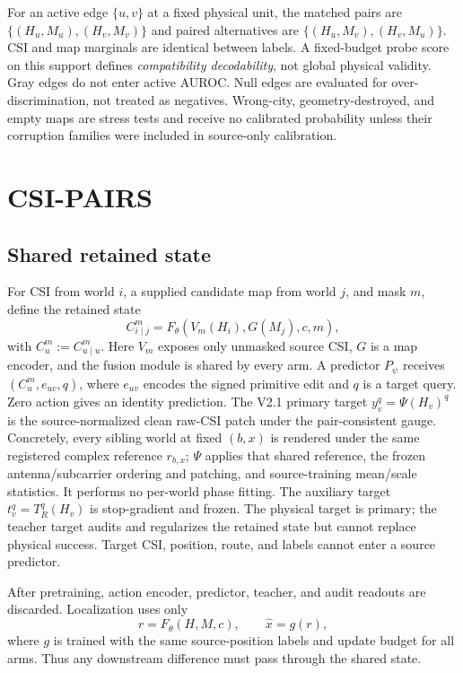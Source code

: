 \documentclass{article}
\newcommand{\csi}{H}
\newcommand{\map}{M}
\newcommand{\enc}{F_{\theta}}
\newcommand{\teacher}{T}
\begin{document}
For an active edge $\{u,v\}$ at a fixed physical unit, the matched pairs are
$\{(\csi_u,\map_u),(\csi_v,\map_v)\}$ and paired alternatives are
$\{(\csi_u,\map_v),(\csi_v,\map_u)\}$.  CSI and map marginals are identical
between labels.  A fixed-budget probe score on this support defines
\emph{compatibility decodability}, not global physical validity.  Gray edges do
not enter active AUROC.  Null edges are evaluated for over-discrimination, not
treated as negatives.  Wrong-city, geometry-destroyed, and empty maps are
stress tests and receive no calibrated probability unless their corruption
families were included in source-only calibration.

\section{CSI-PAIRS}

\subsection{Shared retained state}

For CSI from world $i$, a supplied candidate map from world $j$, and mask $m$,
define the retained state
\begin{equation}
 C_{i\mid j}^m=\enc\!\left(V_m(\csi_i),G(\map_j),c,m\right),
\end{equation}
with $C_u^m:=C_{u\mid u}^m$.  Here $V_m$ exposes only unmasked source CSI, $G$ is a map encoder, and the
fusion module is shared by every arm.  A predictor $P_\psi$ receives
$(C_u^m,e_{uv},q)$, where $e_{uv}$ encodes the signed primitive edit and $q$ is
a target query.  Zero action gives an identity prediction.  The V2.1 primary
target $y_v^q=\Psi(\csi_v)^q$ is the source-normalized clean raw-CSI patch under
the pair-consistent gauge.  Concretely, every sibling world at fixed $(b,x)$ is
rendered under the same registered complex reference $r_{b,x}$; $\Psi$ applies
that shared reference, the frozen antenna/subcarrier ordering and patching, and
source-training mean/scale statistics.  It performs no per-world phase fitting.
The auxiliary target $t_v^q=\teacher_R^q(\csi_v)$ is stop-gradient and frozen.
The physical target is primary; the teacher target audits and regularizes the
retained state but cannot replace physical success.  Target CSI, position,
route, and labels cannot enter a source predictor.

After pretraining, action encoder, predictor, teacher, and audit readouts are
discarded.  Localization uses only
\begin{equation}
 r=\enc(\csi,\map,c),\qquad \widehat{x}=g(r),
\end{equation}
where $g$ is trained with the same source-position labels and update budget for
all arms.  Thus any downstream difference must pass through the shared state.
\end{document}
